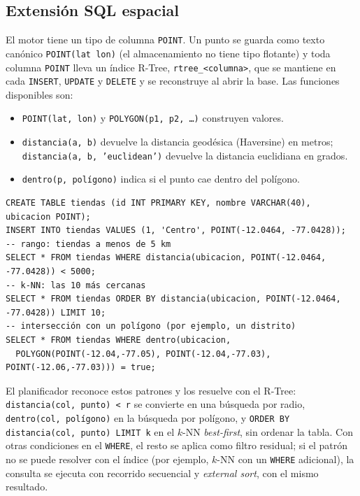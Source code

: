 \documentclass[11pt,a4paper]{article}
\begin{document}
\subsection{Extensión SQL espacial}
\label{sec:sql-espacial}

El motor tiene un tipo de columna \texttt{POINT}. Un punto se guarda como texto canónico \texttt{POINT(lat lon)} (el almacenamiento no tiene tipo flotante) y toda columna \texttt{POINT} lleva un índice R-Tree, \texttt{rtree\_<columna>}, que se mantiene en cada \texttt{INSERT}, \texttt{UPDATE} y \texttt{DELETE} y se reconstruye al abrir la base. Las funciones disponibles son:

\begin{itemize}
  \item \texttt{POINT(lat, lon)} y \texttt{POLYGON(p1, p2, \dots)} construyen valores.
  \item \texttt{distancia(a, b)} devuelve la distancia geodésica (Haversine) en metros; \texttt{distancia(a, b, 'euclidean')} devuelve la distancia euclidiana en grados.
  \item \texttt{dentro(p, polígono)} indica si el punto cae dentro del polígono.
\end{itemize}

\begin{lstlisting}[style=sql]
CREATE TABLE tiendas (id INT PRIMARY KEY, nombre VARCHAR(40), ubicacion POINT);
INSERT INTO tiendas VALUES (1, 'Centro', POINT(-12.0464, -77.0428));
-- rango: tiendas a menos de 5 km
SELECT * FROM tiendas WHERE distancia(ubicacion, POINT(-12.0464, -77.0428)) < 5000;
-- k-NN: las 10 más cercanas
SELECT * FROM tiendas ORDER BY distancia(ubicacion, POINT(-12.0464, -77.0428)) LIMIT 10;
-- intersección con un polígono (por ejemplo, un distrito)
SELECT * FROM tiendas WHERE dentro(ubicacion,
  POLYGON(POINT(-12.04,-77.05), POINT(-12.04,-77.03), POINT(-12.06,-77.03))) = true;
\end{lstlisting}

El planificador reconoce estos patrones y los resuelve con el R-Tree: \texttt{distancia(col, punto) < r} se convierte en una búsqueda por radio, \texttt{dentro(col, polígono)} en la búsqueda por polígono, y \texttt{ORDER BY distancia(col, punto) LIMIT k} en el $k$-NN \emph{best-first}, sin ordenar la tabla. Con otras condiciones en el \texttt{WHERE}, el resto se aplica como filtro residual; si el patrón no se puede resolver con el índice (por ejemplo, $k$-NN con un \texttt{WHERE} adicional), la consulta se ejecuta con recorrido secuencial y \emph{external sort}, con el mismo resultado.
\end{document}
